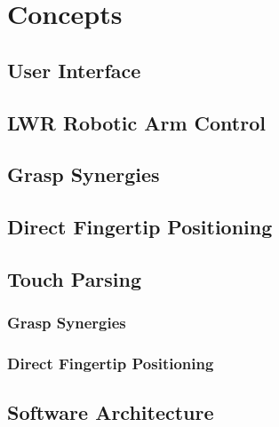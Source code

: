 \chapter{Concepts}
\label{chap:concepts}

\section{User Interface}

\section{LWR Robotic Arm Control}
\label{sec:robotarm:ctrl}

\section{Grasp Synergies}

\section{Direct Fingertip Positioning}

\section{Touch Parsing}

\subsection{Grasp Synergies}

\subsection{Direct Fingertip Positioning}

\section{Software Architecture}